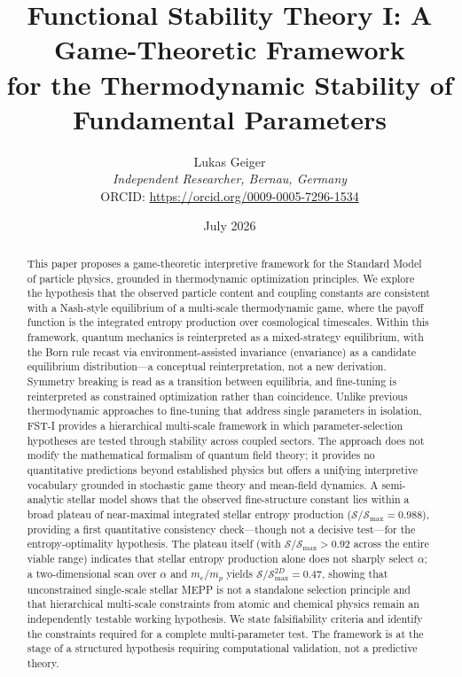 \documentclass[12pt,a4paper]{article}
\title{Functional Stability Theory I: A Game-Theoretic Framework\\for the Thermodynamic Stability of Fundamental Parameters}
\author{Lukas Geiger\\
\textit{Independent Researcher, Bernau, Germany}\\
ORCID: \url{https://orcid.org/0009-0005-7296-1534}}
\date{July 2026}
\theoremstyle{remark}
\begin{document}
\maketitle

\begin{abstract}
This paper proposes a game-theoretic interpretive framework for the Standard Model of particle physics, grounded in thermodynamic optimization principles. We explore the hypothesis that the observed particle content and coupling constants are consistent with a Nash-style equilibrium of a multi-scale thermodynamic game, where the payoff function is the integrated entropy production over cosmological timescales. Within this framework, quantum mechanics is reinterpreted as a mixed-strategy equilibrium, with the Born rule recast via environment-assisted invariance (envariance) as a candidate equilibrium distribution---a conceptual reinterpretation, not a new derivation. Symmetry breaking is read as a transition between equilibria, and fine-tuning is reinterpreted as constrained optimization rather than coincidence. Unlike previous thermodynamic approaches to fine-tuning that address single parameters in isolation, FST-I provides a hierarchical multi-scale framework in which parameter-selection hypotheses are tested through stability across coupled sectors. The approach does not modify the mathematical formalism of quantum field theory; it provides no quantitative predictions beyond established physics but offers a unifying interpretive vocabulary grounded in stochastic game theory and mean-field dynamics. A semi-analytic stellar model shows that the observed fine-structure constant lies within a broad plateau of near-maximal integrated stellar entropy production ($\mathcal{S}/\mathcal{S}_{\max} = 0.988$), providing a first quantitative consistency check---though not a decisive test---for the entropy-optimality hypothesis. The plateau itself (with $\mathcal{S}/\mathcal{S}_{\max} > 0.92$ across the entire viable range) indicates that stellar entropy production alone does not sharply select $\alpha$; a two-dimensional scan over $\alpha$ and $m_e/m_p$ yields $\mathcal{S}/\mathcal{S}_{\max}^{2D} = 0.47$, showing that unconstrained single-scale stellar MEPP is not a standalone selection principle and that hierarchical multi-scale constraints from atomic and chemical physics remain an independently testable working hypothesis. We state falsifiability criteria and identify the constraints required for a complete multi-parameter test. The framework is at the stage of a structured hypothesis requiring computational validation, not a predictive theory.
\end{abstract}
\end{document}
